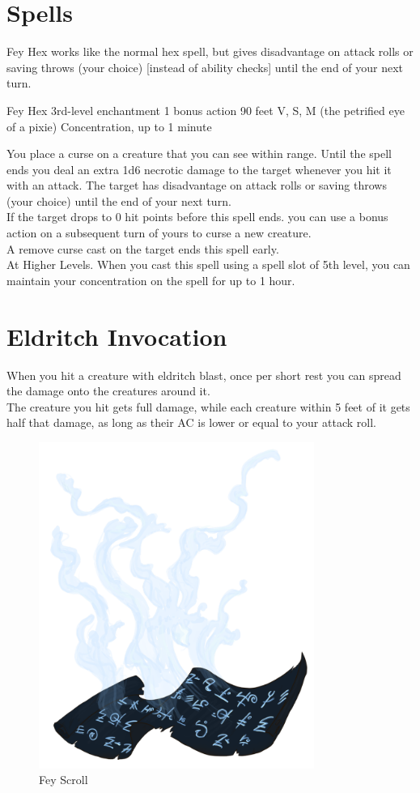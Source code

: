 \documentclass[letter,10pt,twocolumn,openany]{dndbook}
\begin{document}
\section{Spells}

Fey Hex works like the normal hex spell, but gives disadvantage on attack rolls or saving throws (your choice) [instead of ability checks] until the end of your next turn.

\DndSpellHeader%
  {Fey Hex}
  {3rd-level enchantment}
  {1 bonus action}
  {90 feet}
  {V, S, M (the petrified eye of a pixie)}
  {Concentration, up to 1 minute}

You place a curse on a creature that you can see within range. Until the spell ends you deal an extra 1d6 necrotic damage to the target whenever you hit it with an attack. The target has disadvantage on attack rolls or saving throws (your choice) until the end of your next turn.\\
If the target drops to 0 hit points before this spell ends. you can use a bonus action on a subsequent turn of yours to curse a new creature.\\
A remove curse cast on the target ends this spell early.\\
At Higher Levels. When you cast this spell using a spell slot of 5th level, you can maintain your concentration on the spell for up to 1 hour.

\section{Eldritch Invocation}


When you hit a creature with eldritch blast, once per short rest you can spread the damage onto the creatures around it.\\
The creature you hit gets full damage, while each creature within 5 feet of it gets half that damage, as long as their AC is lower or equal to your attack roll.

\begin{figure}
    \includegraphics[width=9cm]{images/fey_scroll.png}
    \caption{Fey Scroll}
\end{figure}
\end{document}
